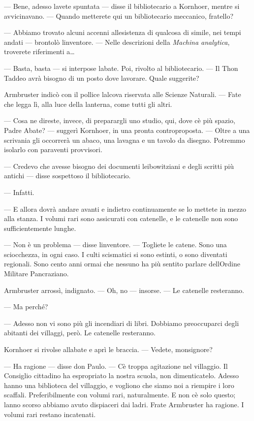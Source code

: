 --- Bene, adesso l\textquotesingle avete spuntata --- disse il
bibliotecario a Kornhoer, mentre si avvicinavano. --- Quando metterete
qui un bibliotecario meccanico, fratello?

--- Abbiamo trovato alcuni accenni all\textquotesingle esistenza di
qualcosa di simile, nei tempi andati --- brontolò
l\textquotesingle inventore. --- Nelle descrizioni della \emph{Machina
	analytica}, troverete riferimenti a\ldots{}

--- Basta, basta --- si interpose l\textquotesingle abate. Poi, rivolto
al bibliotecario. --- Il Thon Taddeo avrà bisogno di un posto dove
lavorare. Quale suggerite?

Armbruster indicò con il pollice l\textquotesingle alcova riservata alle
Scienze Naturali. --- Fate che legga lì, alla luce della lanterna, come
tutti gli altri.

--- Cosa ne direste, invece, di preparargli uno studio, qui, dove
c\textquotesingle è più spazio, Padre Abate? --- suggerì Kornhoer, in
una pronta controproposta. --- Oltre a una scrivania gli occorrerà un
abaco, una lavagna e un tavolo da disegno. Potremmo isolarlo con
paraventi provvisori.

--- Credevo che avesse bisogno dei documenti leibowitziani e degli
scritti più antichi --- disse sospettoso il bibliotecario.

--- Infatti.

--- E allora dovrà andare avanti e indietro continuamente se lo mettete
in mezzo alla stanza. I volumi rari sono assicurati con catenelle, e le
catenelle non sono sufficientemente lunghe.

--- Non è un problema --- disse l\textquotesingle inventore. ---
Togliete le catene. Sono una sciocchezza, in ogni caso. I culti
scismatici si sono estinti, o sono diventati regionali. Sono cento anni
ormai che nessuno ha più sentito parlare dell\textquotesingle Ordine
Militare Pancraziano.

Armbruster arrossì, indignato. --- Oh, no --- insorse. --- Le catenelle
resteranno.

--- Ma perché?

--- Adesso non vi sono più gli incendiari di libri. Dobbiamo
preoccuparci degli abitanti dei villaggi, però. Le catenelle resteranno.

Kornhoer si rivolse all\textquotesingle abate e aprì le braccia. ---
Vedete, monsignore?

--- Ha ragione --- disse don Paulo. --- C\textquotesingle è troppa
agitazione nel villaggio. Il Consiglio cittadino ha espropriato la
nostra scuola, non dimenticatelo. Adesso hanno una biblioteca del
villaggio, e vogliono che siamo noi a riempire i loro scaffali.
Preferibilmente con volumi rari, naturalmente. E non c\textquotesingle è
solo questo; l\textquotesingle anno scorso abbiamo avuto dispiaceri dai
ladri. Frate Armbruster ha ragione. I volumi rari restano incatenati.

